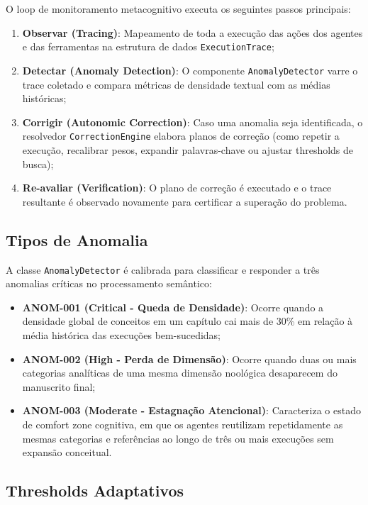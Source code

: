 \documentclass[12pt,a4paper,oneside]{abntex2}
\begin{document}
O loop de monitoramento metacognitivo executa os seguintes passos principais:

\begin{enumerate}
    \item \textbf{Observar (Tracing)}: Mapeamento de toda a execução das ações dos agentes e das ferramentas na estrutura de dados \texttt{ExecutionTrace};
    \item \textbf{Detectar (Anomaly Detection)}: O componente \texttt{AnomalyDetector} varre o trace coletado e compara métricas de densidade textual com as médias históricas;
    \item \textbf{Corrigir (Autonomic Correction)}: Caso uma anomalia seja identificada, o resolvedor \texttt{CorrectionEngine} elabora planos de correção (como repetir a execução, recalibrar pesos, expandir palavras-chave ou ajustar thresholds de busca);
    \item \textbf{Re-avaliar (Verification)}: O plano de correção é executado e o trace resultante é observado novamente para certificar a superação do problema.
\end{enumerate}

\subsection{Tipos de Anomalia}

A classe \texttt{AnomalyDetector} é calibrada para classificar e responder a três anomalias críticas no processamento semântico:

\begin{itemize}
    \item \textbf{ANOM-001 (Critical - Queda de Densidade)}: Ocorre quando a densidade global de conceitos em um capítulo cai mais de 30\% em relação à média histórica das execuções bem-sucedidas;
    \item \textbf{ANOM-002 (High - Perda de Dimensão)}: Ocorre quando duas ou mais categorias analíticas de uma mesma dimensão noológica desaparecem do manuscrito final;
    \item \textbf{ANOM-003 (Moderate - Estagnação Atencional)}: Caracteriza o estado de comfort zone cognitiva, em que os agentes reutilizam repetidamente as mesmas categorias e referências ao longo de três ou mais execuções sem expansão conceitual.
\end{itemize}

\subsection{Thresholds Adaptativos}
\end{document}
